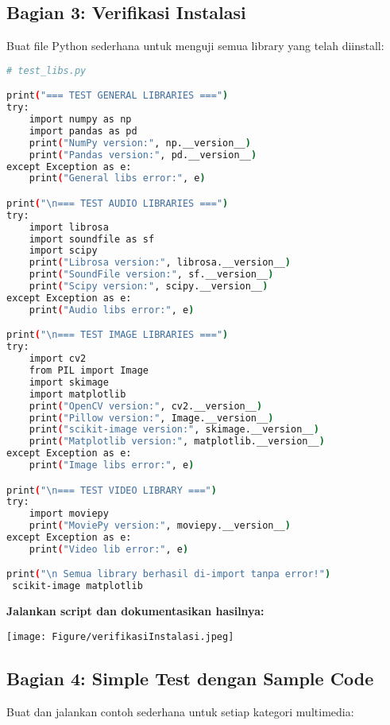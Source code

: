 \documentclass[11pt,a4paper]{article}
\begin{document}
\subsection{Bagian 3: Verifikasi Instalasi}
Buat file Python sederhana untuk menguji semua library yang telah diinstall:
\begin{lstlisting}[language=bash, caption=Instalasi library image]
    # test_libs.py

print("=== TEST GENERAL LIBRARIES ===")
try:
    import numpy as np
    import pandas as pd
    print("NumPy version:", np.__version__)
    print("Pandas version:", pd.__version__)
except Exception as e:
    print("General libs error:", e)

print("\n=== TEST AUDIO LIBRARIES ===")
try:
    import librosa
    import soundfile as sf
    import scipy
    print("Librosa version:", librosa.__version__)
    print("SoundFile version:", sf.__version__)
    print("Scipy version:", scipy.__version__)
except Exception as e:
    print("Audio libs error:", e)

print("\n=== TEST IMAGE LIBRARIES ===")
try:
    import cv2
    from PIL import Image
    import skimage
    import matplotlib
    print("OpenCV version:", cv2.__version__)
    print("Pillow version:", Image.__version__)
    print("scikit-image version:", skimage.__version__)
    print("Matplotlib version:", matplotlib.__version__)
except Exception as e:
    print("Image libs error:", e)

print("\n=== TEST VIDEO LIBRARY ===")
try:
    import moviepy
    print("MoviePy version:", moviepy.__version__)
except Exception as e:
    print("Video lib error:", e)

print("\n Semua library berhasil di-import tanpa error!")
 scikit-image matplotlib
    \end{lstlisting}

\textbf{Jalankan script dan dokumentasikan hasilnya:}
\begin{center}
    \texttt{[image: Figure/verifikasiInstalasi.jpeg]}
    \vspace{0.1cm}
\end{center}

\subsection{Bagian 4: Simple Test dengan Sample Code}
Buat dan jalankan contoh sederhana untuk setiap kategori multimedia:
\end{document}
